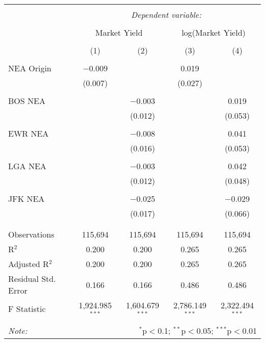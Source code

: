 
\begin{tabular}{@{\extracolsep{5pt}}lcccc} 
\\[-1.8ex]\hline 
\hline \\[-1.8ex] 
 & \multicolumn{4}{c}{\textit{Dependent variable:}} \\ 
\cline{2-5} 
\\[-1.8ex] & \multicolumn{2}{c}{Market Yield} & \multicolumn{2}{c}{log(Market Yield)} \\ 
\\[-1.8ex] & (1) & (2) & (3) & (4)\\ 
\hline \\[-1.8ex] 
 NEA Origin & $-$0.009 &  & 0.019 &  \\ 
  & (0.007) &  & (0.027) &  \\ 
  & & & & \\ 
 BOS NEA &  & $-$0.003 &  & 0.019 \\ 
  &  & (0.012) &  & (0.053) \\ 
  & & & & \\ 
 EWR NEA &  & $-$0.008 &  & 0.041 \\ 
  &  & (0.016) &  & (0.053) \\ 
  & & & & \\ 
 LGA NEA &  & $-$0.003 &  & 0.042 \\ 
  &  & (0.012) &  & (0.048) \\ 
  & & & & \\ 
 JFK NEA &  & $-$0.025 &  & $-$0.029 \\ 
  &  & (0.017) &  & (0.066) \\ 
  & & & & \\ 
\hline \\[-1.8ex] 
Observations & 115,694 & 115,694 & 115,694 & 115,694 \\ 
R$^{2}$ & 0.200 & 0.200 & 0.265 & 0.265 \\ 
Adjusted R$^{2}$ & 0.200 & 0.200 & 0.265 & 0.265 \\ 
Residual Std. Error & 0.166 & 0.166 & 0.486 & 0.486 \\ 
F Statistic & 1,924.985$^{***}$ & 1,604.679$^{***}$ & 2,786.149$^{***}$ & 2,322.494$^{***}$ \\ 
\hline 
\hline \\[-1.8ex] 
\textit{Note:}  & \multicolumn{4}{r}{$^{*}$p$<$0.1; $^{**}$p$<$0.05; $^{***}$p$<$0.01} \\ 
\end{tabular} 

